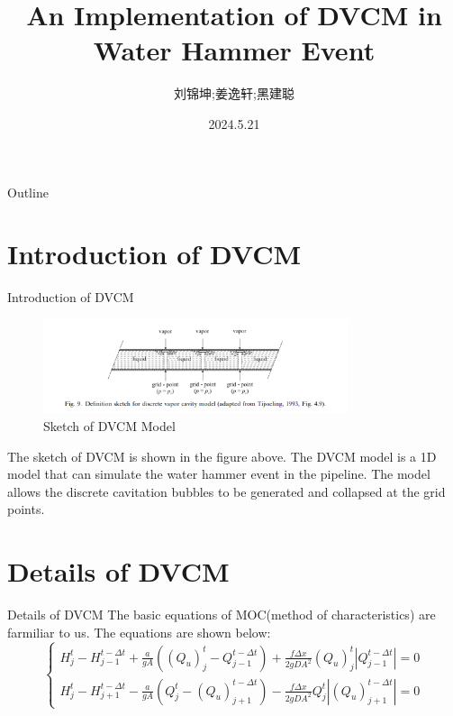 \documentclass[UTF8]{ctexbeamer}
\title{An Implementation of DVCM in Water Hammer Event}
\author{刘锦坤;姜逸轩;黑建聪}
\date{2024.5.21}
\begin{document}
\begin{frame}
    \titlepage
\end{frame}

\begin{frame}{Outline}
    \tableofcontents
\end{frame}

\section{Introduction of DVCM}

\begin{frame}{Introduction of DVCM}
    \begin{figure}
        \centering
        \includegraphics[width=0.8\textwidth]{pic/DVCM_Model.png}
        \caption{Sketch of DVCM Model}
    \end{figure}
    The sketch of DVCM is shown in the figure above. The DVCM model is a 1D model that can simulate the water hammer event in the pipeline. The model allows the discrete cavitation bubbles to be generated and collapsed at the grid points.
\end{frame}

\section{Details of DVCM}

\begin{frame}{Details of DVCM}
    The basic equations of MOC(method of characteristics) are farmiliar to us. The equations are shown below:
    \begin{equation}
        \begin{cases}
            H^t_j-H^{t-\Delta t}_{j-1}+\frac{a}{gA}({(Q_u)}^t_j-Q^{t-\Delta t}_{j-1})+\frac{f\Delta x}{2 g D A^2}{(Q_u)}^t_j|Q^{t-\Delta t}_{j-1}|=0\\
            H^t_j-H^{t-\Delta t}_{j+1}-\frac{a}{gA}(Q^t_j-{(Q_u)}^{t-\Delta t}_{j+1})-\frac{f\Delta x}{2 g D A^2}Q^t_j|{(Q_u)}^{t-\Delta t}_{j+1}|=0
        \end{cases}
    \end{equation}
\end{frame}
\end{document}
